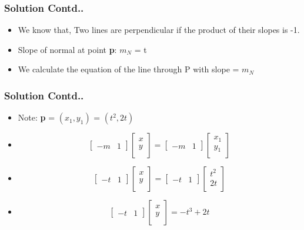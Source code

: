 \documentclass[12pt]{beamer}
\begin{document}

\begin{frame}
\frametitle{Solution Contd..}
\begin{itemize}
\item We know that, Two lines are perpendicular if the product of their slopes is -1.
\item Slope of normal at point \textbf{p}: $m_N$ = t
\item We calculate the equation of the line through P with slope = $m_N$
\end{itemize}
\end{frame}


\begin{frame}
\frametitle{Solution Contd..}
\begin{itemize}
\item Note: \textbf{p} = $( x_1, y_1 )$ = $( t^2, 2t )$
\item
\[
\begin{bmatrix}
    -m & 1  
\end{bmatrix}
\begin{bmatrix}
    x\\
    y\\  
\end{bmatrix} = 
\begin{bmatrix}
    -m & 1  
\end{bmatrix}
\begin{bmatrix}
    x_1\\
    y_1\\  
\end{bmatrix}
\]
\item
\[
\begin{bmatrix}
    -t & 1  
\end{bmatrix}
\begin{bmatrix}
    x\\
    y\\  
\end{bmatrix} = 
\begin{bmatrix}
    -t & 1  
\end{bmatrix}
\begin{bmatrix}
    t^2\\
    2t\\  
\end{bmatrix}
\]
\item \[
\begin{bmatrix}
    -t & 1  
\end{bmatrix}
\begin{bmatrix}
    x\\
    y\\  
\end{bmatrix} = 
-t^3 + 2t
\]
\end{itemize}
\end{frame}
\end{document}
